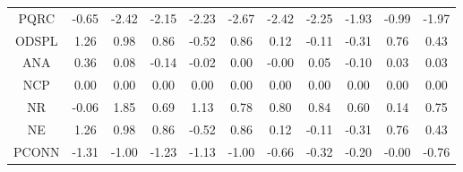 \begin{longtable}{ | c || c | c | c | c | c | c | c | c | c || c |}
PQRC &  \cellcolor[HTML]{FFEFEF} -0.65 &  \cellcolor[HTML]{FFBFBF} -2.42 &  \cellcolor[HTML]{FFC7C7} -2.15 &  \cellcolor[HTML]{FFC7C7} -2.23 &  \cellcolor[HTML]{FFBFBF} -2.67 &  \cellcolor[HTML]{FFBFBF} -2.42 &  \cellcolor[HTML]{FFC7C7} -2.25 &  \cellcolor[HTML]{FFCFCF} -1.93 &  \cellcolor[HTML]{FFE7E7} -0.99 &  \cellcolor[HTML]{FFCFCF} -1.97 \\
ODSPL &  \cellcolor[HTML]{DFDFFF} 1.26 &  \cellcolor[HTML]{E7E7FF} 0.98 &  \cellcolor[HTML]{E7E7FF} 0.86 &  \cellcolor[HTML]{FFEFEF} -0.52 &  \cellcolor[HTML]{E7E7FF} 0.86 &  \cellcolor[HTML]{FFFFFF} 0.12 &  \cellcolor[HTML]{FFFFFF} -0.11 &  \cellcolor[HTML]{FFF7F7} -0.31 &  \cellcolor[HTML]{EFEFFF} 0.76 &  \cellcolor[HTML]{F7F7FF} 0.43 \\
ANA &  \cellcolor[HTML]{F7F7FF} 0.36 &  \cellcolor[HTML]{FFFFFF} 0.08 &  \cellcolor[HTML]{FFFFFF} -0.14 &  \cellcolor[HTML]{FFFFFF} -0.02 &  \cellcolor[HTML]{FFFFFF} 0.00 &  \cellcolor[HTML]{FFFFFF} -0.00 &  \cellcolor[HTML]{FFFFFF} 0.05 &  \cellcolor[HTML]{FFFFFF} -0.10 &  \cellcolor[HTML]{FFFFFF} 0.03 &  \cellcolor[HTML]{FFFFFF} 0.03 \\
NCP &  \cellcolor[HTML]{FFFFFF} 0.00 &  \cellcolor[HTML]{FFFFFF} 0.00 &  \cellcolor[HTML]{FFFFFF} 0.00 &  \cellcolor[HTML]{FFFFFF} 0.00 &  \cellcolor[HTML]{FFFFFF} 0.00 &  \cellcolor[HTML]{FFFFFF} 0.00 &  \cellcolor[HTML]{FFFFFF} 0.00 &  \cellcolor[HTML]{FFFFFF} 0.00 &  \cellcolor[HTML]{FFFFFF} 0.00 &  \cellcolor[HTML]{FFFFFF} 0.00 \\
NR &  \cellcolor[HTML]{FFFFFF} -0.06 &  \cellcolor[HTML]{CFCFFF} 1.85 &  \cellcolor[HTML]{EFEFFF} 0.69 &  \cellcolor[HTML]{DFDFFF} 1.13 &  \cellcolor[HTML]{EFEFFF} 0.78 &  \cellcolor[HTML]{E7E7FF} 0.80 &  \cellcolor[HTML]{E7E7FF} 0.84 &  \cellcolor[HTML]{EFEFFF} 0.60 &  \cellcolor[HTML]{FFFFFF} 0.14 &  \cellcolor[HTML]{EFEFFF} 0.75 \\
NE &  \cellcolor[HTML]{DFDFFF} 1.26 &  \cellcolor[HTML]{E7E7FF} 0.98 &  \cellcolor[HTML]{E7E7FF} 0.86 &  \cellcolor[HTML]{FFEFEF} -0.52 &  \cellcolor[HTML]{E7E7FF} 0.86 &  \cellcolor[HTML]{FFFFFF} 0.12 &  \cellcolor[HTML]{FFFFFF} -0.11 &  \cellcolor[HTML]{FFF7F7} -0.31 &  \cellcolor[HTML]{EFEFFF} 0.76 &  \cellcolor[HTML]{F7F7FF} 0.43 \\
PCONN &  \cellcolor[HTML]{FFDFDF} -1.31 &  \cellcolor[HTML]{FFE7E7} -1.00 &  \cellcolor[HTML]{FFDFDF} -1.23 &  \cellcolor[HTML]{FFDFDF} -1.13 &  \cellcolor[HTML]{FFE7E7} -1.00 &  \cellcolor[HTML]{FFEFEF} -0.66 &  \cellcolor[HTML]{FFF7F7} -0.32 &  \cellcolor[HTML]{FFF7F7} -0.20 &  \cellcolor[HTML]{FFFFFF} -0.00 &  \cellcolor[HTML]{FFEFEF} -0.76 \\

\end{longtable}
